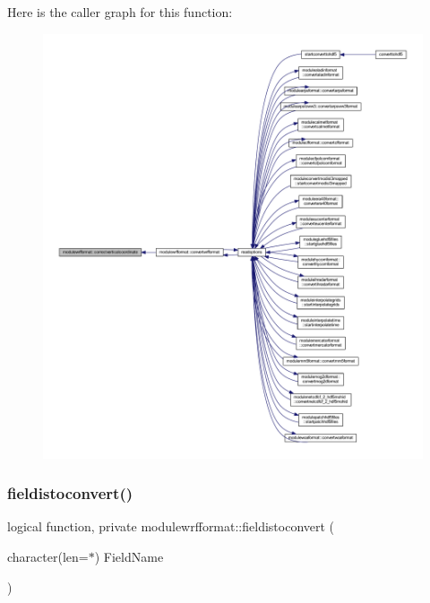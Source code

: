Here is the caller graph for this function\+:\nopagebreak
\begin{figure}[H]
\begin{center}
\leavevmode
\includegraphics[width=350pt]{namespacemodulewrfformat_ac71176572d5f88cc34053061c13c6256_icgraph}
\end{center}
\end{figure}
\mbox{\label{namespacemodulewrfformat_a8116c1c7ac79eeffc8e9a9316b030276}} 
\subsubsection{\texorpdfstring{fieldistoconvert()}{fieldistoconvert()}}
{\footnotesize\ttfamily logical function, private modulewrfformat\+::fieldistoconvert (\begin{DoxyParamCaption}\item[{character(len=$\ast$)}]{Field\+Name }\end{DoxyParamCaption})\hspace{0.3cm}{\ttfamily [private]}}

